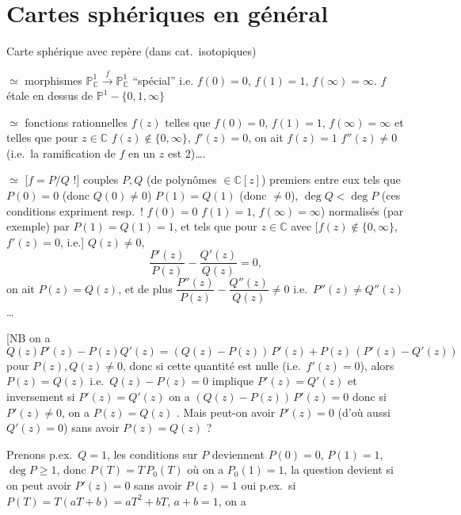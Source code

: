 \documentclass[11pt,a4paper]{article}
\begin{document}
\section{Cartes sphériques en général}

Carte sphérique  avec repère (dans cat.\ isotopiques)

$\simeq$ morphismes $\mathbb{P}^1_{\mathbb{C}} \xrightarrow{\ f\ }
\mathbb{P}^1_{\mathbb{C}}$ “spécial” i.e.
$f(0)=0$, $f(1)=1$, $f(\infty)=\infty$. $f$ étale en dessus de
$\mathbb{P}^1 - \{0,1,\infty\}$

$\simeq$ fonctions rationnelles $f(z)$ telles que $f(0)=0$, $f(1)=1$,
$f(\infty)=\infty$ et telles que pour $z\in\mathbb{C}$ 
 $f(z)\notin\{0,\infty\}$, $f'(z)=0$, on ait $f(z)=1$
\struck{\ill{}}  $f''(z)\neq 0$ (i.e.\ la ramification de $f$
en un $z$ est $2$)….

$\simeq$ [$f=P/Q$ !] couples $P,Q$ (de polynômes $\in\mathbb{C}[z]$) premiers
entre eux  tels que $P(0)=0$ (donc
$Q(0)\neq 0$) $P(1)=Q(1)$ (donc $\neq 0$), $\deg Q<\deg P$ (ces conditions
expriment resp.\ ! $f(0)=0$ $f(1)=1$, $f(\infty)=\infty$) normalisés (par
exemple) par $P(1)=Q(1)=1$, et tels que pour $z\in\mathbb{C}$ avec
[$f(z)\notin\{0,\infty\}$, $f'(z)=0$, i.e.]  $Q(z)\neq 0$,
\[
\frac{P'(z)}{P(z)} - \frac{Q'(z)}{Q(z)} = 0 ,
\]
on ait $P(z)=Q(z)$, et de plus
$\dfrac{P''(z)}{P(z)} - \dfrac{Q''(z)}{Q(z)} \neq 0$ i.e.\ $P''(z)\neq Q''(z)$…

[NB on a
\[
Q(z)P'(z) - P(z)Q'(z) = (Q(z)-P(z))\,P'(z) + P(z)\,(P'(z)-Q'(z))
\]
pour $P(z), Q(z)\neq 0$, donc si cette quantité est nulle (i.e.\ $f'(z)=0$), alors $P(z)=Q(z)$ \struck{\ill{}} i.e.\ $Q(z)-P(z)=0$ implique
$P'(z)=Q'(z)$ et inversement si $P'(z)=Q'(z)$ on a $(Q(z)-P(z))\,P'(z)=0$
donc si $P'(z)\neq 0$, on a $P(z)=Q(z)$ . Mais
peut-on avoir $P'(z)=0$ (d'où aussi $Q'(z)=0$) \ill{} sans avoir
$P(z)=Q(z)$ ?

 Prenons p.ex.\ $Q=1$, les conditions sur $P$
deviennent  $P(0)=0$, $P(1)=1$,
$\deg P\geq 1$, donc  $P(T)=T\,P_0(T)$ où on a
 $P_0(1)=1$, la question devient si on peut avoir
$P'(z)=0$ sans avoir $P(z)=1$  oui p.ex.\ si
$P(T)=T(aT+b)=aT^2+bT$, $a+b=1$, on a
\end{document}
